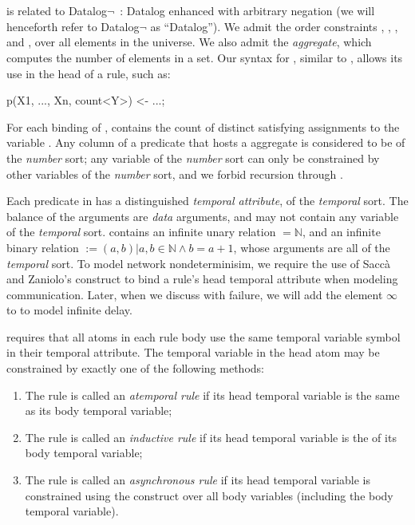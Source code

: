 \section{\large \bf \lang}
\label{sec:slang}

\lang is related to Datalog$\lnot$~\cite{ullmanbook}: Datalog enhanced with arbitrary negation (we will henceforth refer to Datalog$\lnot$ as ``Datalog'').  We admit the order constraints \dedalus{<}, \dedalus{=}, \dedalus{!=}, and \dedalus{<=}, over all elements in the universe.  We also admit the  {\em aggregate}, which computes the number of elements in a set.  Our syntax for , similar to , allows its use in the head of a rule, such as: 

\begin{Dedalus}
p(X1, ..., Xn, count<Y>) <- ...;
\end{Dedalus}

For each binding of ,  contains the count of distinct satisfying assignments to the variable .  Any column of a predicate that hosts a  aggregate is considered to be of the {\em number} sort; any variable of the {\em number} sort can only be constrained by other variables of the {\em number} sort, and we forbid recursion through .

Each predicate in \lang has a distinguished {\em temporal attribute}, of the {\em temporal} sort.  The balance of the arguments are {\em data} arguments, and may not contain any variable of the {\em temporal} sort.  \lang contains an infinite unary relation  $= \mathbb{N}$, and an infinite binary relation  $:= {(a,b) | a,b \in \mathbb{N} \land b = a + 1}$, whose arguments are all of the {\em temporal} sort.  To model network nondeterminisim, we require the use of Sacc\`{a} and Zaniolo's  construct to bind a rule's head temporal attribute when modeling communication.  Later, when we discuss \lang with failure, we will add the element $\infty$ to  to model infinite delay.

\lang requires that all atoms in each rule body use the same temporal variable symbol in their temporal attribute.  The temporal variable in the head atom may be constrained by exactly one of the following methods:

\begin{enumerate}
\item The rule is called an {\em atemporal rule} if its head temporal variable is the same as its body temporal variable;
\item The rule is called an {\em inductive rule} if its head temporal variable is the  of its body temporal variable;
\item The rule is called an {\em asynchronous rule} if its head temporal variable is constrained using the  construct over all body variables (including the body temporal variable).
\end{enumerate}

